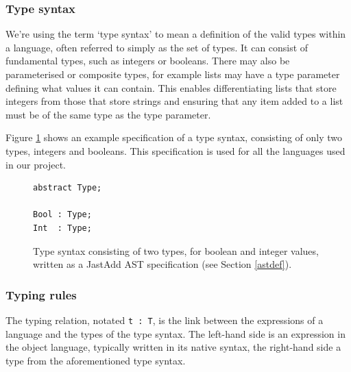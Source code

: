 \documentclass[nofilelist]{cslthse-msc}
\newcommand{\CR}[1]{\textcolor{green!60!black}{[\textbf{CR}:#1]}}
\newcommand{\reviewquestion}[1]{\textcolor{red!80!black}{[\textbf{Review question}:#1]}}
\begin{document}
\subsubsection{Type syntax}\label{typesyntax}
We're using the term `type syntax' to mean a definition of the valid types within a language, often referred to simply as the set of types.
It can consist of fundamental types, such as integers or booleans.
There may also be parameterised or composite types, for example lists may have a type parameter defining what values it can contain.
This enables differentiating lists that store integers from those that store strings and ensuring that any item added to a list must be of the same type as the type parameter.

Figure \ref{typesyntaxspec} shows an example specification of a type syntax, consisting of only two types, integers and booleans.
This specification is used for all the languages used in our project.
\begin{figure}[]
\begin{lstlisting}[]
abstract Type;

Bool : Type;
Int  : Type;
\end{lstlisting}
  \caption{Type syntax consisting of two types, for boolean and integer values, written as a JastAdd AST specification (see Section \ref{astdef}).}
  \label{typesyntaxspec}
\end{figure}

\subsubsection{Typing rules}
The typing relation, notated \lstinline{t : T}, is the link between the expressions of a language and the types of the type syntax.
The left-hand side is an expression in the object language, typically written in its native syntax, the right-hand side a type from the aforementioned type syntax.
\end{document}

